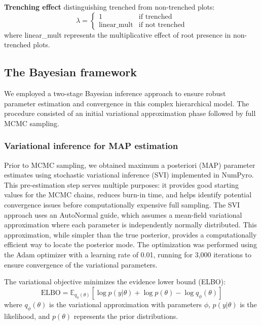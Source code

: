 \documentclass[12pt,a4paper]{article}
\begin{document}
\textbf{Trenching effect} distinguishing trenched from non-trenched plots:
\begin{equation}
\lambda = \begin{cases}
1 & \text{if trenched} \\
\text{linear\_mult} & \text{if not trenched}
\end{cases}
\end{equation}
where linear\_mult represents the multiplicative effect of root presence in non-trenched plots.

\subsection{The Bayesian framework}

We employed a two-stage Bayesian inference approach to ensure robust parameter estimation and convergence in this complex hierarchical model. The procedure consisted of an initial variational approximation phase followed by full MCMC sampling.

\subsubsection{Variational inference for MAP estimation}
Prior to MCMC sampling, we obtained maximum a posteriori (MAP) parameter estimates using stochastic variational inference (SVI) implemented in NumPyro. This pre-estimation step serves multiple purposes: it provides good starting values for the MCMC chains, reduces burn-in time, and helps identify potential convergence issues before computationally expensive full sampling.
The SVI approach uses an AutoNormal guide, which assumes a mean-field variational approximation where each parameter is independently normally distributed. This approximation, while simpler than the true posterior, provides a computationally efficient way to locate the posterior mode. The optimization was performed using the Adam optimizer with a learning rate of 0.01, running for 3,000 iterations to ensure convergence of the variational parameters.

The variational objective minimizes the evidence lower bound (ELBO):
\begin{equation}
\text{ELBO} = \mathbb{E}_{q_\phi(\theta)}[\log p(y|\theta) + \log p(\theta) - \log q_\phi(\theta)]
\end{equation}
where $q_\phi(\theta)$ is the variational approximation with parameters $\phi$, $p(y|\theta)$ is the likelihood, and $p(\theta)$ represents the prior distributions.
\end{document}
